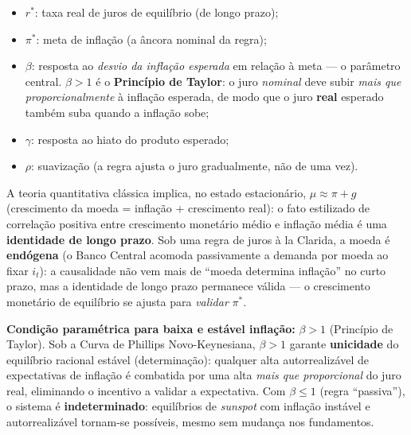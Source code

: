 \documentclass[12pt, a4paper]{article}
\begin{document}
\begin{fatorbox}[title={i) Interpretação dos parâmetros estruturais}]
\begin{itemize}[leftmargin=*]
  \item $r^{*}$: taxa real de juros de equilíbrio (de longo prazo);
  \item $\pi^{*}$: meta de inflação (a âncora nominal da regra);
  \item $\beta$: resposta ao \emph{desvio da inflação esperada} em relação à
    meta --- o parâmetro central. $\beta>1$ é o \textbf{Princípio de
    Taylor}: o juro \emph{nominal} deve subir \emph{mais que
    proporcionalmente} à inflação esperada, de modo que o juro \textbf{real}
    esperado também suba quando a inflação sobe;
  \item $\gamma$: resposta ao hiato do produto esperado;
  \item $\rho$: suavização (a regra ajusta o juro gradualmente, não de uma vez).
\end{itemize}
\end{fatorbox}

\begin{fatorbox}[title={ii) Correlação moeda--inflação de longo prazo e o papel de $\beta>1$}]
A teoria quantitativa clássica implica, no estado estacionário,
$\mu \approx \pi + g$ (crescimento da moeda = inflação + crescimento real):
o fato estilizado de correlação positiva entre crescimento monetário médio e
inflação média é uma \textbf{identidade de longo prazo}. Sob uma regra de
juros à la Clarida, a moeda é \textbf{endógena} (o Banco Central acomoda
passivamente a demanda por moeda ao fixar $i_t$): a causalidade não vem mais
de ``moeda determina inflação'' no curto prazo, mas a identidade de longo
prazo permanece válida --- o crescimento monetário de equilíbrio se ajusta
para \emph{validar} $\pi^{*}$.
\par\smallskip
\textbf{Condição paramétrica para baixa e estável inflação:} $\beta>1$
(Princípio de Taylor). Sob a Curva de Phillips Novo-Keynesiana,
$\beta>1$ garante \textbf{unicidade} do equilíbrio racional estável
(determinação): qualquer alta autorrealizável de expectativas de inflação é
combatida por uma alta \emph{mais que proporcional} do juro real, eliminando
o incentivo a validar a expectativa. Com $\beta\le 1$ (regra ``passiva''),
o sistema é \textbf{indeterminado}: equilíbrios de \emph{sunspot} com
inflação instável e autorrealizável tornam-se possíveis, mesmo sem mudança
nos fundamentos.
\end{fatorbox}
\end{document}
